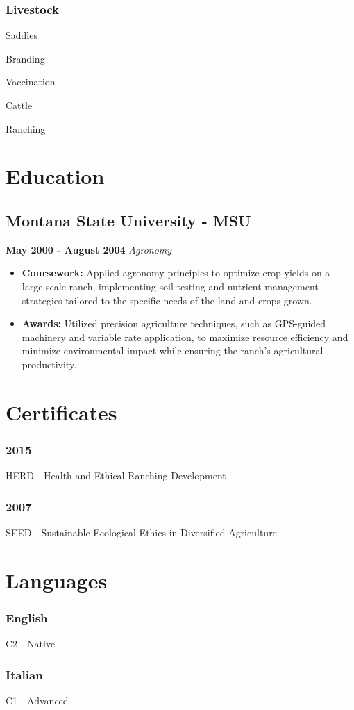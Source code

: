 \documentclass[a4paper]{article}
\begin{document}
\subsubsection
  {Livestock}
\begin{itemize*}
  \item Saddles
  \item Branding
  \item Vaccination
  \item Cattle
  \item Ranching
\end{itemize*}

\section{Education}
\subsection{Montana State University - MSU}
    \textbf{May 2000 - August 2004}
    \textit{Agronomy}
\begin{itemize}
    \item \textbf{Coursework:} Applied agronomy principles to optimize crop yields on a large-scale ranch, implementing soil testing and nutrient management strategies tailored to the specific needs of the land and crops grown.
    \item \textbf{Awards:} Utilized precision agriculture techniques, such as GPS-guided machinery and variable rate application, to maximize resource efficiency and minimize environmental impact while ensuring the ranch's agricultural productivity.
\end{itemize}


\section{Certificates}
\subsubsection
  {2015}
  HERD - Health and Ethical Ranching Development
  \vspace{-1.5em}

\subsubsection
  {2007}
  SEED - Sustainable Ecological Ethics in Diversified Agriculture

\section{Languages}
\subsubsection
{English}
C2 - Native

\subsubsection
{Italian}
C1 - Advanced
\end{document}
